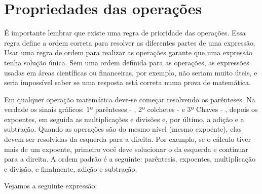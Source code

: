         \begin{texample}
        \centering
        \end{texample}
	
	\section{Propriedades das operações}
 
	É importante lembrar que existe uma regra de prioridade das operações. Essa regra define a ordem correta para resolver as diferentes partes de uma expressão. Usar uma regra de ordem para realizar as operações garante que uma expressão tenha solução única. Sem uma ordem definida para as operações, as expressões usadas em áreas científicas ou financeiras, por exemplo, não seriam muito úteis, e seria impossível saber se uma resposta está correta numa prova de matemática.
	
	Em qualquer operação matemática deve-se começar resolvendo os parênteses. Na verdade os sinais gráficos: 1º parênteses - \text{( )}, 2º colchetes - \text{[ ]} e 3º Chaves - \text{\{ \}}, depois os expoentes, em seguida as multiplicações e divisões e, por último, a adição e a subtração. Quando as operações são do mesmo nível (mesmo expoente), elas devem ser resolvidas da esquerda para a direita. Por exemplo, se o cálculo tiver mais de um expoente, primeiro você deve solucionar o da esquerda e continuar para a direita. A ordem padrão é a seguinte: parêntesis, expoentes, multiplicação e divisão, e finalmente, adição e subtração.
	
	Vejamos a seguinte expressão:

        \begin{texample}
        \centering
        \end{texample}
	
